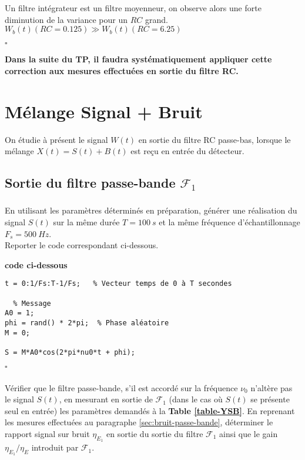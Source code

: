 \documentclass{article}
\newcommand{\debutrep}[1]{\color{blue}\begin{center} \hrulefill \textbf{ #1 } \hrulefill \end{center} }
\newcommand{\finrep}{\vspace*{5mm}\hfill $\square$\color{black}\vspace*{5mm}}
\begin{document}
Un filtre intégrateur est un filtre moyenneur, on observe alors une forte diminution de la variance pour un $RC$ grand.\\
$W_b(t) (RC = 0.125) \gg W_b(t) (RC=6.25)$

\finrep

\textbf{Dans la suite du TP, il faudra systématiquement appliquer cette correction aux mesures effectuées en sortie du filtre RC.}

\clearpage
\section{Mélange Signal + Bruit}
\label{sec:melange}

On étudie à présent le signal $W(t)$ en sortie du filtre RC passe-bas, lorsque le mélange $X(t) = S(t) + B(t)$ est reçu en entrée du détecteur.

\subsection{Sortie du filtre passe-bande $\mathcal{F}_1$}

\subsubsection{}

En utilisant  les paramètres déterminés en préparation, générer une réalisation du signal $S(t)$ sur la même durée $T=100~s$ et la même fréquence d'échantillonnage $F_s = 500~Hz$. \\[1mm]
Reporter le code correspondant ci-dessous.

\debutrep{code ci-dessous}
\begin{verbatim}
t = 0:1/Fs:T-1/Fs;   % Vecteur temps de 0 à T secondes

  % Message
A0 = 1;
phi = rand() * 2*pi;  % Phase aléatoire
M = 0;

S = M*A0*cos(2*pi*nu0*t + phi);
\end{verbatim}
\finrep

 
\subsubsection{}

Vérifier que le filtre passe-bande, s'il est accordé sur la fréquence $\nu_0$ n'altère pas le  signal $S(t)$, en mesurant en sortie de $\mathcal{F}_1$ (dans le cas où $S(t)$ se présente seul en entrée) les paramètres demandés à la \textbf{Table \ref{table-YSB}}. En reprenant les mesures  effectuées au paragraphe \ref{sec:bruit-passe-bande}, déterminer le rapport signal sur bruit $\eta_{E_1}$ en sortie du sortie du filtre $\mathcal{F}_1$ ainsi que le gain $\eta_{E_1}/\eta_E$ introduit par $\mathcal{F}_1$.
\end{document}
